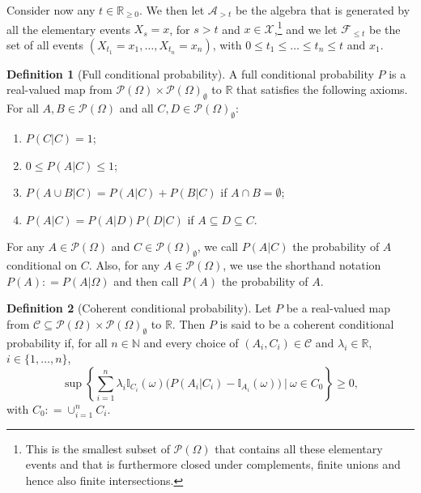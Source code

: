 \documentclass[10pt]{paper}
\theoremstyle{definition}
\newtheorem{definition}{Definition}
\newcommand{\reals}{\mathbb{R}}
\newcommand{\realsnonneg}{\reals_{\geq 0}}
\newcommand{\states}{\mathcal{X}}
\newcommand{\paths}{\Omega}
\newcommand{\power}{\mathcal{P}(\paths)}
\newcommand{\nonemptypower}{\power_{\emptyset}}
\newcommand{\filter}[1][t]{\mathcal{F}_{#1}}
\newcommand{\ind}[1]{\mathbb{I}_{#1}}
\newcommand{\coloneqq}{:\!=}
\begin{document}
Consider now any $t\in\realsnonneg$. We then let $\mathcal{A}_{>t}$ be the algebra that is generated by all the elementary events $X_s=x$, for $s> t$ and $x\in\states$,\footnote{This is the smallest subset of $\power$ that contains all these elementary events and that is furthermore closed under complements, finite unions and hence also finite intersections.} and we let $\mathcal{F}_{\leq t}$ be the set of all events $\left(X_{t_1}=x_{1}, \dots, X_{t_n}=x_{n}\right)$, with $0\leq t_1\leq\dots\leq t_n\leq t$ and $x_1$.%

\begin{definition}[Full conditional probability]\label{def:cond_prob}
A full conditional probability $P$ is a real-valued map from $\power\times\nonemptypower$ to $\reals$ that satisfies the following axioms. For all $A,B\in\power$ and all \mbox{$C,D\in\nonemptypower$}:
\vspace{5pt}

\begin{enumerate}[label=F\arabic*:]
\item
$P(C\vert C)=1$;
\item
$0\leq P(A\vert C)\leq 1$;
\item
$P(A\cup B\vert C)=P(A\vert C)+P(B\vert C)$ if $A\cap B=\emptyset$;
\item
$P(A\vert C)=P(A\vert D)P(D\vert C)$ if $A\subseteq D\subseteq C$.
\end{enumerate}
\vspace{5pt}

\noindent
For any $A\in\power$ and $C\in\nonemptypower$, we call $P(A\vert C)$ the probability of $A$ conditional on $C$. Also, for any $A\in\power$, we use the shorthand notation $P(A)\coloneqq P(A\vert\paths)$ and then call $P(A)$ the probability of $A$.
\end{definition}

\begin{definition}[Coherent conditional probability]\label{def:coherence}
Let $P$ be a real-valued map from $\mathcal{C}\subseteq\power\times\nonemptypower$ to $\reals$. Then $P$ is said to be a coherent conditional probability if, for all $n\in\mathbb{N}$ and every choice of $(A_i,C_i)\in\mathcal{C}$ and $\lambda_i\in\reals$, $i\in\{1,\dots,n\}$,
\begin{equation*}
\sup\left\{\sum_{i=1}^n\lambda_i\ind{C_i}(\omega)\bigl(P(A_i\vert C_i)-\ind{A_i}(\omega)\bigr)~\Bigg\vert~\omega\in C_0\right\}\geq0,
\end{equation*}
with $C_0\coloneqq\cup_{i=1}^nC_i$.
\end{definition}
\end{document}
